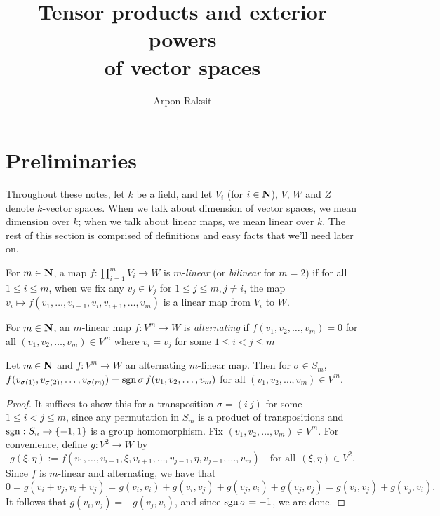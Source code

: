 

\title{Tensor products and exterior powers \\ of vector spaces}
\author{Arpon Raksit}


\thispagestyle{fancy}
\maketitle

\section{Preliminaries}

  Throughout these notes, let $k$ be a field, and let $V_i$ (for $i
  \in \boldsymbol{\mathbf{N}}$), $V$, $W$ and $Z$ denote $k$-vector spaces. When we talk
  about dimension of vector spaces, we mean dimension over $k$; when
  we talk about linear maps, we mean linear over $k$. The rest of this
  section is comprised of definitions and easy facts that we'll need
  later on.

\begin{dfn}
  For $m \in \boldsymbol{\mathbf{N}}$, a map $f: \prod_{i=1}^m V_i \to W$ is
  $m$-\textit{linear} (or \textit{bilinear} for $m=2$) if for all $1
  \le i \le m$, when we fix any $v_j \in V_j$ for $1 \le j \le m,j \ne
  i$, the map $v_i \mapsto f(v_1, \ldots, v_{i-1}, v_i , v_{i+1},
  \ldots, v_m)$ is a linear map from $V_i$ to $W$.
\end{dfn}

\begin{dfn}
  For $m \in \boldsymbol{\mathbf{N}}$, an $m$-linear map $f: V^m \to W$ is
  \textit{alternating} if $f(v_1,v_2,\ldots,v_m) = 0$ for all
  $(v_1,v_2,\ldots,v_m) \in V^m$ where $v_i = v_j$ for some $1 \le i <
  j \le m$
\end{dfn}

\begin{lem}
  \label{altskew}
  Let $m \in \boldsymbol{\mathbf{N}}$ and $f: V^m \to W$ an alternating $m$-linear
  map. Then for $\sigma \in S_m$,
  $f(v_{\sigma(1)},v_{\sigma(2)},\ldots,v_{\sigma(m)}) = \operatorname{sgn}\sigma\,f
  (v_1,v_2,\ldots,v_m)$ for all $(v_1,v_2,\ldots,v_m) \in V^m$.
  \begin{proof}
    It suffices to show this for a transposition $\sigma = (i\ j)$ for
    some $1 \le i < j \le m$, since any permutation in $S_m$ is a
    product of transpositions and $\operatorname{sgn} : S_n \to \left\{-1,1\right\}$
    is a group homomorphism. Fix $(v_1,v_2,\ldots,v_m) \in V^m$. For
    convenience, define $g: V^2 \to W$ by
    \[
    g(\xi,\eta) := f(v_1,\ldots,v_{i-1}, \xi, v_{i+1}, \ldots,v_{j-1},
    \eta,v_{j+1},\ldots,v_m)\quad \text{for all}\ \ (\xi,\eta) \in
    V^2.
    \]
    Since $f$ is $m$-linear and alternating, we have that
    \[
    0 = g(v_i+v_j,v_i+v_j) = g(v_i,v_i) + g(v_i,v_j) + g(v_j,v_i) +
    g(v_j,v_j) = g(v_i,v_j) + g(v_j,v_i).
    \]
    It follows that $g(v_i,v_j) = -g(v_j,v_i)$, and since $\operatorname{sgn}\sigma
    = -1$, we are done.
  \end{proof}
\end{lem}

